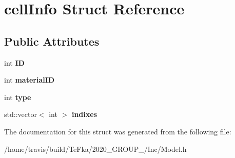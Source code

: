 \hypertarget{structcell_info}{}\section{cell\+Info Struct Reference}
\label{structcell_info}
\subsection*{Public Attributes}
\begin{DoxyCompactItemize}
\item 
int {\bfseries ID}\hypertarget{structcell_info_ab1aa474e08f44d86083037c014ad4746}{}\label{structcell_info_ab1aa474e08f44d86083037c014ad4746}

\item 
int {\bfseries material\+ID}\hypertarget{structcell_info_af226971bcc6ed0aa5a676623bb0b9c33}{}\label{structcell_info_af226971bcc6ed0aa5a676623bb0b9c33}

\item 
int {\bfseries type}\hypertarget{structcell_info_a62d34f940eb373d0f1657caea79d3e85}{}\label{structcell_info_a62d34f940eb373d0f1657caea79d3e85}

\item 
std\+::vector$<$ int $>$ {\bfseries indixes}\hypertarget{structcell_info_ab28d2d23ee7f5667488609a16b7a7084}{}\label{structcell_info_ab28d2d23ee7f5667488609a16b7a7084}

\end{DoxyCompactItemize}


The documentation for this struct was generated from the following file\+:\begin{DoxyCompactItemize}
\item 
/home/travis/build/\+Te\+Fka/2020\+\_\+\+G\+R\+O\+U\+P\+\_/\+Inc/Model.\+h\end{DoxyCompactItemize}

